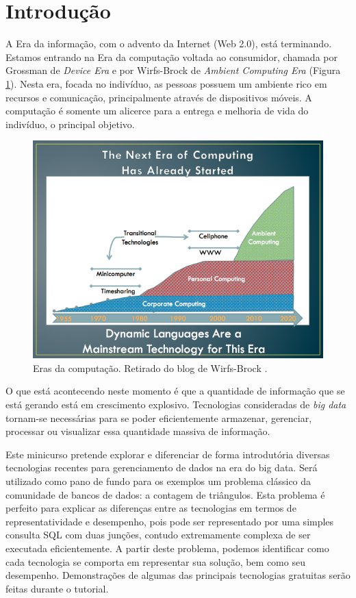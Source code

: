 \section{Introdução}

A Era da informação, com o advento da Internet (Web 2.0), está terminando. Estamos entrando na
Era da computação voltada ao consumidor, chamada por Grossman de \textit{Device Era}
\cite{grossman2012structure} e por Wirfs-Brock de 
\emph{Ambient Computing Era} \cite{wirfsbrock2011blog} (Figura \ref{fig:ambientcomputing_era}). 
Nesta era, focada no indivíduo, as pessoas possuem um ambiente rico em recursos e comunicação, 
principalmente através de dispositivos móveis. A computação é somente um alicerce para a entrega 
e melhoria de vida do indivíduo, o principal objetivo.

\begin{figure}[h]
        \centering
        \includegraphics[width=0.7\linewidth]{3eras-medium.png}
        \caption{Eras da computação. Retirado do blog de Wirfs-Brock \cite{wirfsbrock2011blog}.}
        \label{fig:ambientcomputing_era}
\end{figure}


O que está acontecendo neste momento é que a quantidade de informação que se está gerando 
está em crescimento explosivo. Tecnologias consideradas de \emph{big data} tornam-se 
necessárias para se poder eficientemente armazenar, gerenciar, processar ou
visualizar essa quantidade massiva de informação.

Este minicurso pretende explorar e diferenciar de forma introdutória diversas tecnologias recentes
para gerenciamento de dados na era do big data. Será utilizado como pano de fundo para os
exemplos um problema clássico da comunidade de bancos de dados: a contagem de triângulos.
Esta problema é perfeito para explicar as diferenças entre as tecnologias em termos de
representatividade e desempenho, pois pode ser representado por uma simples consulta SQL com
duas junções, contudo extremamente complexa de ser executada eficientemente. A partir deste
problema, podemos identificar como cada tecnologia se comporta em representar sua solução,
bem como seu desempenho. Demonstrações de algumas das principais tecnologias gratuitas
serão feitas durante o tutorial.

